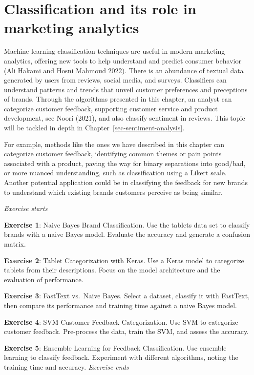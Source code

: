 \section{Classification and its role in marketing
analytics}\label{classification-and-its-role-in-marketing-analytics}

Machine-learning classification techniques are useful in modern
marketing analytics, offering new tools to help understand and predict
consumer behavior (Ali Hakami and Hosni Mahmoud 2022). There is an
abundance of textual data generated by users from reviews, social media,
and surveys. Classifiers can understand patterns and trends that unveil
customer preferences and preceptions of brands. Through the algorithms presented
in this chapter, an analyst can categorize customer feedback, supporting
customer service and product development, see Noori (2021), and also classify sentiment in reviews. This topic will be tackled in depth
in Chapter~\ref{sec-sentiment-analysis}.

For example, methods like the ones we have described in this chapter can
categorize customer feedback, identifying common themes or pain points
associated with a product, paving the way for binary separations into
good/bad, or more nuanced understanding, such as classification using a Likert scale.
Another potential application could be in classifying the feedback for new
brands to understand which existing brands customers perceive as being similar.

\emph{Exercise starts}

\textbf{Exercise 1}: Naive Bayes Brand Classification. Use the tablets
data set to classify brands with a naive Bayes model. Evaluate the accuracy
and generate a confusion matrix.

\textbf{Exercise 2}: Tablet Categorization with Keras. Use a Keras
model to categorize tablets from their descriptions. Focus on the model
architecture and the evaluation of performance.

\textbf{Exercise 3}: FastText vs.~Naive Bayes. Select a dataset,
classify it with FastText, then compare its performance and training time
against a naive Bayes model.

\textbf{Exercise 4}: SVM Customer-Feedback Categorization. Use SVM to
categorize customer feedback. Pre-process the data, train the SVM, and assess
the accuracy.

\textbf{Exercise 5}: Ensemble Learning for Feedback Classification.
Use ensemble learning to classify feedback. Experiment with different
algorithms, noting the training time and accuracy. \emph{Exercise ends}

